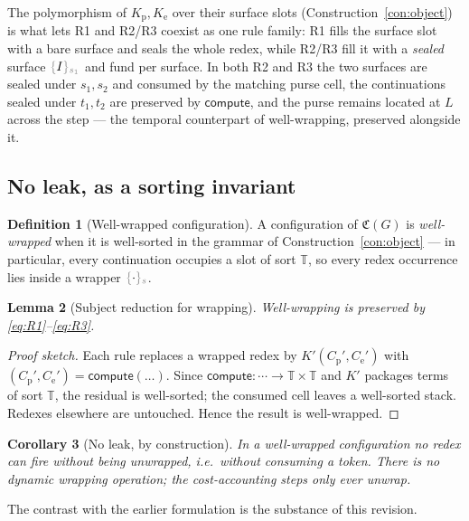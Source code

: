 \documentclass[11pt]{article}
\theoremstyle{definition}
\newtheorem{definition}{Definition}[section]
\theoremstyle{plain}
\newtheorem{lemma}[definition]{Lemma}
\newtheorem{corollary}[definition]{Corollary}
\newcommand{\dec}[1]{\textcolor{costgray}{#1}}   %
\newcommand{\WT}{\mathbb{T}}                  %
\newcommand{\Cost}{\mathfrak{C}}              %
\newcommand{\sgn}[2]{\dec{\{}{#1}\dec{\}_{#2}}}  %
\newcommand{\compute}{\mathsf{compute}}
\newcommand{\Kp}{K_{\mathrm{p}}}
\newcommand{\Ke}{K_{\mathrm{e}}}
\begin{document}
%
The polymorphism of $\Kp,\Ke$ over their surface slots
(Construction~\ref{con:object}) is what lets R1 and R2/R3 coexist as one
rule family: R1 fills the surface slot with a bare surface and seals the
whole redex, while R2/R3 fill it with a \emph{sealed} surface
$\sgn{I}{s_1}$ and fund per surface. In both R2 and R3 the two surfaces
are sealed under $s_1,s_2$ and consumed by the matching purse cell, the
continuations sealed under $t_1,t_2$ are preserved by $\compute$, and the
purse remains located at $L$ across the step --- the temporal counterpart
of well-wrapping, preserved alongside it.

\subsection{No leak, as a sorting invariant}

\begin{definition}[Well-wrapped configuration]
A configuration of $\Cost(G)$ is \emph{well-wrapped} when it is
well-sorted in the grammar of Construction~\ref{con:object} --- in
particular, every continuation occupies a slot of sort $\WT$, so every
redex occurrence lies inside a wrapper $\sgn{\cdot}{s}$.
\end{definition}

\begin{lemma}[Subject reduction for wrapping]
\label{lem:subject}
Well-wrapping is preserved by \eqref{eq:R1}--\eqref{eq:R3}.
\end{lemma}

\begin{proof}[Proof sketch]
Each rule replaces a wrapped redex by $K'(C_{\mathrm p}',C_{\mathrm e}')$
with $(C_{\mathrm p}',C_{\mathrm e}') = \compute(\dots)$. Since
$\compute : \cdots \to \WT\times\WT$ and $K'$ packages terms of sort
$\WT$, the residual is well-sorted; the consumed cell leaves a
well-sorted stack. Redexes elsewhere are untouched. Hence the result is
well-wrapped.
\end{proof}

\begin{corollary}[No leak, by construction]
\label{cor:noleak}
In a well-wrapped configuration no redex can fire without being unwrapped,
i.e.\ without consuming a token. There is no dynamic wrapping operation;
the cost-accounting steps only ever unwrap.
\end{corollary}

The contrast with the earlier formulation is the substance of this
revision.
\end{document}
